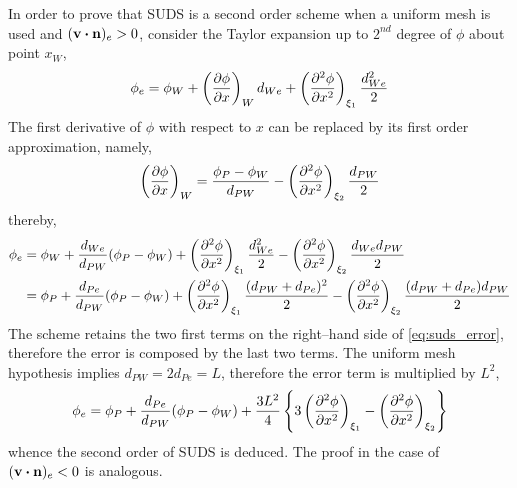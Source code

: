 In order to prove that SUDS is a second order scheme when a uniform mesh
is used and $(\vb{v} \vdot \vb{n})_e > 0$, consider the Taylor expansion up to
$2^{nd}$ degree of $\phi$ about point $x_W$,
\begin{equation*}
	\phi_e = 
	\phi_W + 
	\left( \pdv{\phi}{x} \right)_W d_{We} + 
	\left( \pdv[2]{\phi}{x} \right)_{\xi_1} \frac{d_{We}^2}{2}
\end{equation*}
The first derivative of $\phi$ with respect to $x$ can be replaced by its first
order approximation, namely,
\begin{equation*}
	\left(\pdv{\phi}{x}\right)_W = 
	\frac{\phi_P - \phi_W}{d_{PW}} - \left(\pdv[2]{\phi}{x}\right)_{\xi_2} \frac{d_{PW}}{2}
\end{equation*}
thereby,
\begin{align}
	\phi_e 
	&= 
	\phi_W + 
	\frac{d_{We}}{d_{PW}} (\phi_P - \phi_W) + 
	\left( \pdv[2]{\phi}{x} \right)_{\xi_1} \frac{d_{We}^2}{2} - 
	\left( \pdv[2]{\phi}{x} \right)_{\xi_2} \frac{d_{We} d_{PW}}{2} \nonumber \\
	&= 
	\phi_P + 
	\frac{d_{Pe}}{d_{PW}} (\phi_P - \phi_W) + 
	\left( \pdv[2]{\phi}{x} \right)_{\xi_1} \frac{(d_{PW} + d_{Pe})^2}{2} - 
	\left( \pdv[2]{\phi}{x} \right)_{\xi_2} \frac{(d_{PW} + d_{Pe}) d_{PW}}{2}	
	\label{eq:suds_error}
\end{align}
The scheme retains the two first terms on the right--hand side of
\eqref{eq:suds_error}, therefore the error is composed by the last two terms.
The uniform mesh hypothesis implies $d_{PW} = 2 d_{Pe} = L$, therefore the error
term is multiplied by $L^2$,
\begin{equation*}
	\phi_e = 
	\phi_P + \frac{d_{Pe}}{d_{PW}} (\phi_P - \phi_W) + 
	\frac{3 L^2}{4}
	\left\{
	3 \left( \pdv[2]{\phi}{x} \right)_{\xi_1} - \left( \pdv[2]{\phi}{x} \right)_{\xi_2}
	\right\}
\end{equation*}
whence the second order of SUDS is deduced. The proof in the case of $(\vb{v}
\vdot \vb{n})_e < 0$ is analogous.